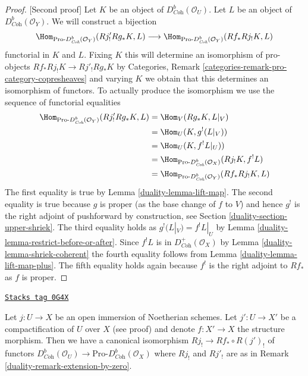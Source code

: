\begin{proof}
[Second proof]
Let $K$ be an object of $D^b_{\textit{Coh}}(\mathcal{O}_U)$.
Let $L$ be an object of $D^b_{\textit{Coh}}(\mathcal{O}_Y)$.
We will construct a bijection
$$
\Hom_{\text{Pro-}D^b_{\textit{Coh}}(\mathcal{O}_Y)}(Rj'_!Rg_*K, L)
\longrightarrow
\Hom_{\text{Pro-}D^b_{\textit{Coh}}(\mathcal{O}_Y)}(Rf_*Rj_!K, L)
$$
functorial in $K$ and $L$. Fixing $K$ this will determine an isomorphism
of pro-objects
$Rf_*Rj_!K \to Rj'_!Rg_*K$
by Categories, Remark \ref{categories-remark-pro-category-copresheaves}
and varying $K$ we obtain that this determines
an isomorphism of functors. To actually produce the isomorphism we
use the sequence of functorial equalities
\begin{align*}
\Hom_{\text{Pro-}D^b_{\textit{Coh}}(\mathcal{O}_Y)}(Rj'_!Rg_*K, L)
& =
\Hom_V(Rg_*K, L|_V) \\
& =
\Hom_U(K, g^!(L|_V)) \\
& =
\Hom_U(K, f^!L|_U)) \\
& =
\Hom_{\text{Pro-}D^b_{\textit{Coh}}(\mathcal{O}_X)}(Rj_!K, f^!L) \\
& =
\Hom_{\text{Pro-}D^b_{\textit{Coh}}(\mathcal{O}_Y)}(Rf_*Rj_!K, L)
\end{align*}
The first equality is true by Lemma \ref{duality-lemma-lift-map}.
The second equality is true because $g$ is proper (as the base change
of $f$ to $V$) and hence $g^!$ is the right adjoint of pushforward by
construction, see Section \ref{duality-section-upper-shriek}.
The third equality holds as $g^!(L|_V) = f^!L|_U$ by
Lemma \ref{duality-lemma-restrict-before-or-after}.
Since $f^!L$ is in $D^+_{\textit{Coh}}(\mathcal{O}_X)$ by
Lemma \ref{duality-lemma-shriek-coherent} the fourth equality follows from
Lemma \ref{duality-lemma-lift-map-plus}. The fifth equality holds again
because $f^!$ is the right adjoint to $Rf_*$ as $f$ is proper.
\end{proof}

\begin{lemma}
\label{duality-lemma-well-defined}
\href{https://stacks.math.columbia.edu/tag/0G4X}{\texttt{Stacks tag 0G4X}}

Let $j : U \to X$ be an open immersion of Noetherian schemes.
Let $j' : U \to X'$ be a compactification of $U$ over $X$ (see proof)
and denote $f : X' \to X$ the structure morphism.
Then we have a canonical isomorphism $Rj_! \to Rf_* \circ R(j')_!$
of functors $D^b_{\textit{Coh}}(\mathcal{O}_U) \to
\text{Pro-}D^b_{\textit{Coh}}(\mathcal{O}_X)$ where
$Rj_!$ and $Rj'_!$ are as in Remark \ref{duality-remark-extension-by-zero}.
\end{lemma}


